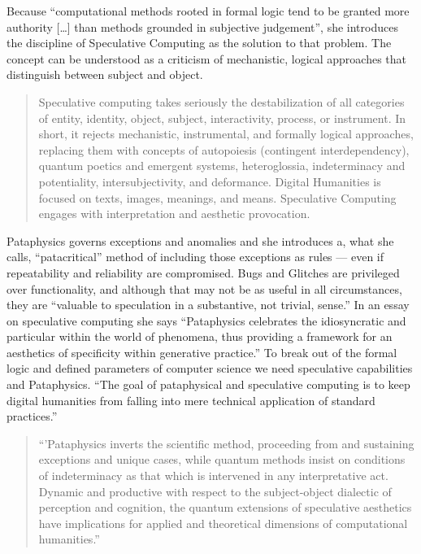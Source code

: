 Because ``computational methods rooted in formal logic tend to be granted more authority […] than methods grounded in subjective judgement'', she introduces the discipline of Speculative Computing as the solution to that problem.  The concept can be understood as a criticism of mechanistic, logical approaches that distinguish between subject and object.

\begin{quote}
  Speculative computing takes seriously the destabilization of all categories of entity, identity, object, subject, interactivity, process, or instrument. In short, it rejects mechanistic, instrumental, and formally logical approaches, replacing them with concepts of autopoiesis (contingent interdependency), quantum poetics and emergent systems, heteroglossia, indeterminacy and potentiality, intersubjectivity, and deformance. Digital Humanities is focused on texts, images, meanings, and means. Speculative Computing engages with interpretation and aesthetic provocation. \citep[p.29]{Drucker2009}
\end{quote}

Pataphysics governs exceptions and anomalies and she introduces a, what she calls, ``patacritical'' method of including those exceptions as rules --- even if repeatability and reliability are compromised. Bugs and Glitches are privileged over functionality, and although that may not be as useful in all circumstances, they are ``valuable to speculation in a substantive, not trivial, sense.'' In an essay on speculative computing \citep{Drucker2007} she says ``Pataphysics celebrates the idiosyncratic and particular within the world of phenomena, thus providing a framework for an aesthetics of specificity within generative practice.'' To break out of the formal logic and defined parameters of computer science we need speculative capabilities and Pataphysics. ``The goal of pataphysical and speculative computing is to keep digital humanities from falling into mere technical application of standard practices.''

\begin{quote}
  ``'Pataphysics inverts the scientific method, proceeding from and sustaining exceptions and unique cases, while quantum methods insist on conditions of indeterminacy as that which is intervened in any interpretative act. Dynamic and productive with respect to the subject-object dialectic of perception and cognition, the quantum extensions of speculative aesthetics have implications for applied and theoretical dimensions of computational humanities.'' \citep{Drucker2007}%
\end{quote}


